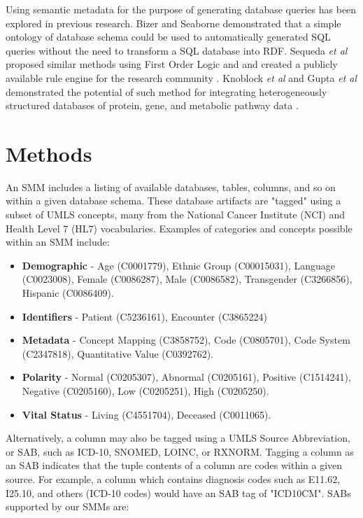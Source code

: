 \documentclass[../main.tex]{subfiles}
\begin{document}
Using semantic metadata for the purpose of generating database queries has been explored in previous research. Bizer and Seaborne \cite{bizertreating} demonstrated that a simple ontology of database schema could be used to automatically generated SQL queries without the need to transform a SQL database into RDF. Sequeda \textit{et al} proposed similar methods using First Order Logic and and created a publicly available rule engine for the research community \cite{sequeda2009direct,sequeda2011survey}. Knoblock \textit{et al} and Gupta \textit{et al} demonstrated the potential of such method for integrating heterogeneously structured databases of protein, gene, and metabolic pathway data \cite{knoblock2012semi, gupta2015karma}.

\section{Methods}

An SMM includes a listing of available databases, tables, columns, and so on within a given database schema. These database artifacts are "tagged" using a subset of UMLS concepts, many from the National Cancer Institute (NCI) and Health Level 7 (HL7) vocabularies. Examples of categories and concepts possible within an SMM include:

\begin{itemize}
    \item \textbf{Demographic} - Age (C0001779), Ethnic Group (C00015031), Language (C0023008), Female (C0086287), Male (C0086582), Transgender (C3266856), Hispanic (C0086409). 
    \item \textbf{Identifiers} - Patient (C5236161), Encounter (C3865224)
    \item \textbf{Metadata} - Concept Mapping (C3858752), Code (C0805701), Code System (C2347818), Quantitative Value (C0392762).
    \item \textbf{Polarity} - Normal (C0205307), Abnormal (C0205161), Positive (C1514241), Negative (C0205160), Low (C0205251), High (C0205250).
    \item \textbf{Vital Status} - Living (C4551704), Deceased (C0011065).
\end{itemize}

Alternatively, a column may also be tagged using a UMLS Source Abbreviation, or SAB, such as ICD-10, SNOMED, LOINC, or RXNORM. Tagging a column as an SAB indicates that the tuple contents of a column are codes within a given source. For example, a column which contains diagnosis codes such as E11.62, I25.10, and others (ICD-10 codes) would have an SAB tag of "ICD10CM". SABs supported by our SMMs are:
\end{document}
